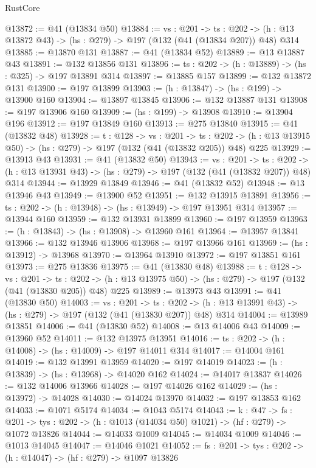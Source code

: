 \begin{lexlean}{RustCore}
\begin{coremodule}
@13872 := @41 (@13834 @50)
@13884 := {vs : @201} ->
  {ts : @202} -> (h : @13 @13872 @43) -> (hs : @279) -> @197 (@132 (@41 (@13834 @207)) @48) @314
@13885 := @13870 @131
@13887 := @41 (@13834 @52)
@13889 := @13 @13887 @43
@13891 := @132 @13856 @131
@13896 := {ts : @202} -> (h : @13889) -> (hs : @325) -> @197 @13891 @314
@13897 := @13885 @157
@13899 := @132 @13872 @131
@13900 := @197 @13899
@13903 := (h : @13847) -> (hs : @199) -> @13900 @160
@13904 := @13897 @13845
@13906 := @132 @13887 @131
@13908 := @197 @13906 @160
@13909 := (hs : @199) -> @13908
@13910 := @13904 @196
@13912 := @197 @13849 @160
@13913 := @275 @13840
@13915 := @41 (@13832 @48)
@13928 := {t : @128} ->
  {vs : @201} ->
  {ts : @202} -> (h : @13 @13915 @50) -> (hs : @279) -> @197 (@132 (@41 (@13832 @205)) @48) @225
@13929 := @13913 @43
@13931 := @41 (@13832 @50)
@13943 := {vs : @201} ->
  {ts : @202} -> (h : @13 @13931 @43) -> (hs : @279) -> @197 (@132 (@41 (@13832 @207)) @48) @314
@13944 := @13929 @13849
@13946 := @41 (@13832 @52)
@13948 := @13 @13946 @43
@13949 := @13900 @52
@13951 := @132 @13915 @13891
@13956 := {ts : @202} -> (h : @13948) -> (hs : @13949) -> @197 @13951 @314
@13957 := @13944 @160
@13959 := @132 @13931 @13899
@13960 := @197 @13959
@13963 := (h : @13843) -> (hs : @13908) -> @13960 @161
@13964 := @13957 @13841
@13966 := @132 @13946 @13906
@13968 := @197 @13966 @161
@13969 := (hs : @13912) -> @13968
@13970 := @13964 @13910
@13972 := @197 @13851 @161
@13973 := @275 @13836
@13975 := @41 (@13830 @48)
@13988 := {t : @128} ->
  {vs : @201} ->
  {ts : @202} -> (h : @13 @13975 @50) -> (hs : @279) -> @197 (@132 (@41 (@13830 @205)) @48) @225
@13989 := @13973 @43
@13991 := @41 (@13830 @50)
@14003 := {vs : @201} ->
  {ts : @202} -> (h : @13 @13991 @43) -> (hs : @279) -> @197 (@132 (@41 (@13830 @207)) @48) @314
@14004 := @13989 @13851
@14006 := @41 (@13830 @52)
@14008 := @13 @14006 @43
@14009 := @13960 @52
@14011 := @132 @13975 @13951
@14016 := {ts : @202} -> (h : @14008) -> (hs : @14009) -> @197 @14011 @314
@14017 := @14004 @161
@14019 := @132 @13991 @13959
@14020 := @197 @14019
@14023 := (h : @13839) -> (hs : @13968) -> @14020 @162
@14024 := @14017 @13837
@14026 := @132 @14006 @13966
@14028 := @197 @14026 @162
@14029 := (hs : @13972) -> @14028
@14030 := @14024 @13970
@14032 := @197 @13853 @162
@14033 := @1071 @5174
@14034 := @1043 @5174
@14043 := {k : @47} ->
  {fs : @201} -> {tys : @202} -> (h : @1013 (@14034 @50) @1021) -> (hf : @279) -> @1072 @13826
@14044 := @14033 @1009
@14045 := @14034 @1009
@14046 := @1013 @14045
@14047 := @14046 @1021
@14052 := {fs : @201} -> {tys : @202} -> (h : @14047) -> (hf : @279) -> @1097 @13826

\end{coremodule}
\end{lexlean}
